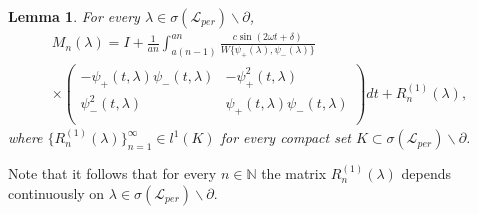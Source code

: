\documentclass[a4paper,oneside,12pt]{amsart}
\newtheorem{lem}{Lemma}
\begin{document}
    \begin{lem}\label{lem M-n(lambda)}
    For every $\lambda\in\sigma(\mathcal L_{per})\backslash\partial$,
    \begin{multline*}
    M_n(\lambda)=I+\frac1{an}\int_{a(n-1)}^{an}
    \frac{c\sin(2\omega t+\delta)}{W\{\psi_+(\lambda),\psi_-(\lambda)\}}
    \\
    \times
    \left(    \begin{array}{cc}
    -\psi_+(t,\lambda)\psi_-(t,\lambda) & -\psi_+^2(t,\lambda) \\
    \psi_-^2(t,\lambda) & \psi_+(t,\lambda)\psi_-(t,\lambda) \\
    \end{array}    \right)dt
    +R_n^{(1)}(\lambda),
    \end{multline*}
    where $\{R_n^{(1)}(\lambda)\}_{n=1}^{\infty}\in l^1(K)$ for every compact set $K\subset\sigma(\mathcal L_{per})\backslash\partial$.
    \end{lem}

Note that it follows that for every $n\in\mathbb N$ the matrix $R_n^{(1)}(\lambda)$ depends continuously on $\lambda\in\sigma(\mathcal L_{per})\backslash\partial$.
\end{document}
